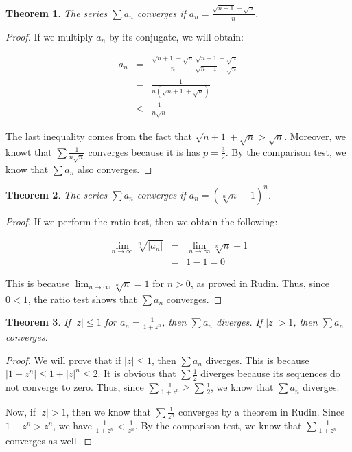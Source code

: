 \documentclass[psamsfonts]{amsart}
\newtheorem{thm}{Theorem}[section]
\theoremstyle{definition}
\theoremstyle{remark}
\numberwithin{equation}{section}
\begin{document}
\begin{thm}
The series $\sum a_n$ converges if $a_n = \frac{\sqrt{n+1} - \sqrt{n}}{n}$.
\end{thm}

\begin{proof}
If we multiply $a_n$ by its conjugate, we will obtain:

\begin{eqnarray}
a_n &=& \frac{\sqrt{n+1} - \sqrt{n}}{n} \frac{\sqrt{n+1} + \sqrt{n}}{\sqrt{n+1}+\sqrt{n}} \\
&=& \frac{1}{ n (\sqrt{n+1} + \sqrt{n})} \\
&<& \frac{1}{ n \sqrt{n}} 
\end{eqnarray}

The last inequality comes from the fact that $\sqrt{n+1} + \sqrt{n} > \sqrt{n}$. Moreover, we knowt that $\sum \frac{1}{n \sqrt{n}}$ converges because it is has $p = \frac{3}{2}$. By the comparison test, we know that $\sum a_n$ also converges.
\end{proof}

\begin{thm}
The series $\sum a_n$ converges if $a_n = (\sqrt[n]{n} - 1)^n$. 
\end{thm}

\begin{proof}
If we perform the ratio test, then we obtain the following:

\begin{eqnarray}
\lim_{n \to \infty} \sqrt[n]{|a_n|} &=& \lim_{n \to \infty} \sqrt[n]{n} - 1 \\
&=& 1 - 1 = 0
\end{eqnarray}

This is because $\lim_{n \to \infty} \sqrt[n]{n} = 1$ for $n>0$, as proved in Rudin. Thus, since $0 < 1$, the ratio test shows that $\sum a_n$ converges.
\end{proof}

\begin{thm}
If $|z| \leq 1$ for $a_n = \frac{1}{1+z^n}$, then $\sum a_n$ diverges. If $|z| > 1$, then $\sum a_n$ converges. 
\end{thm}

\begin{proof}
We will prove that if $|z| \leq 1$, then $\sum a_n$ diverges. This is because $|1 + z^n| \leq {1 + |z|^n} \leq {2}$. It is obvious that $\sum \frac{1}{2}$ diverges because its sequences do not converge to zero. Thus, since $\sum \frac{1}{1 + z^n} \geq \sum \frac{1}{2}$, we know that $\sum a_n$ diverges.

Now, if $|z| > 1$, then we know that $\sum \frac{1}{z^n}$ converges by a theorem in Rudin. Since $1 + z^n > z^n$, we have $\frac{1}{1 + z^n} < \frac{1}{z^n}$. By the comparison test, we know that $\sum \frac{1}{1+z^n}$ converges as well. 
\end{proof}
\end{document}
